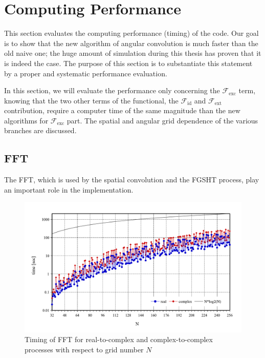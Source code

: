 
\chapter{Computing Performance \label{chpt:seq-code-performance}}

This section evaluates the computing performance (timing) of the code.
Our goal is to show that the new algorithm of angular convolution
is much faster than the old naive one; the huge amount of simulation
during this thesis has proven that it is indeed the case. The purpose
of this section is to substantiate this statement by a proper and
systematic performance evaluation.

In this section, we will evaluate the performance only concerning
the $\mathcal{F}_{\mathrm{exc}}$ term, knowing that the two other
terms of the functional, the $\mathcal{F}_{\mathrm{id}}$ and $\mathcal{F}_{\mathrm{ext}}$
contribution, require a computer time of the same magnitude than the
new algorithms for $\mathcal{F}_{\mathrm{exc}}$ part. The spatial
and angular grid dependence of the various branches are discussed.

\section{FFT}

The \acs{FFT}, which is used by the spatial convolution and the \acs{FGSHT}
process, play an important role in the implementation. 

\begin{figure}[H]
\begin{centering}
\includegraphics[bb=0bp 20bp 567bp 310bp,width=1\columnwidth]{_figure/results/fftw_timing}
\par\end{centering}
\caption{Timing of \acs{FFT} for real-to-complex and complex-to-complex processes
with respect to grid number $N$\label{fig:timing-FFT}}
\end{figure}

